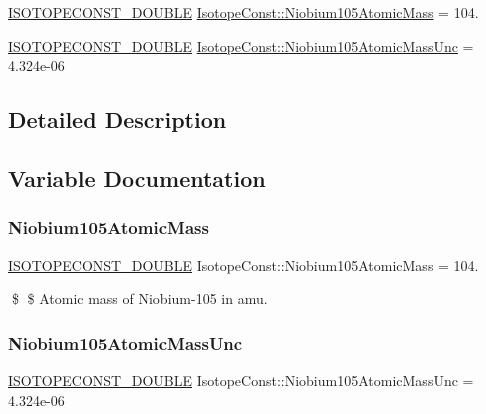 \begin{DoxyCompactItemize}
\item 
\mbox{\hyperlink{group___isotope_const-_macros_ga8f45a7272ce02c0b4c65c44636ed719a}{I\+S\+O\+T\+O\+P\+E\+C\+O\+N\+S\+T\+\_\+\+D\+O\+U\+B\+LE}} \mbox{\hyperlink{group___isotope_const-_niobium-_nb105_gaf553e5c6986396ae3624bb59ffc86ddf}{Isotope\+Const\+::\+Niobium105\+Atomic\+Mass}} = 104.
\item 
\mbox{\hyperlink{group___isotope_const-_macros_ga8f45a7272ce02c0b4c65c44636ed719a}{I\+S\+O\+T\+O\+P\+E\+C\+O\+N\+S\+T\+\_\+\+D\+O\+U\+B\+LE}} \mbox{\hyperlink{group___isotope_const-_niobium-_nb105_ga8095e9133f80bc7ab5b7a01681632142}{Isotope\+Const\+::\+Niobium105\+Atomic\+Mass\+Unc}} = 4.\+324e-\/06
\end{DoxyCompactItemize}


\subsection{Detailed Description}


\subsection{Variable Documentation}
\mbox{\label{group___isotope_const-_niobium-_nb105_gaf553e5c6986396ae3624bb59ffc86ddf}} 
\subsubsection{\texorpdfstring{Niobium105\+Atomic\+Mass}{Niobium105AtomicMass}}
{\footnotesize\ttfamily \mbox{\hyperlink{group___isotope_const-_macros_ga8f45a7272ce02c0b4c65c44636ed719a}{I\+S\+O\+T\+O\+P\+E\+C\+O\+N\+S\+T\+\_\+\+D\+O\+U\+B\+LE}} Isotope\+Const\+::\+Niobium105\+Atomic\+Mass = 104.}

\$ \$ Atomic mass of Niobium-\/105 in amu. \mbox{\label{group___isotope_const-_niobium-_nb105_ga8095e9133f80bc7ab5b7a01681632142}} 
\subsubsection{\texorpdfstring{Niobium105\+Atomic\+Mass\+Unc}{Niobium105AtomicMassUnc}}
{\footnotesize\ttfamily \mbox{\hyperlink{group___isotope_const-_macros_ga8f45a7272ce02c0b4c65c44636ed719a}{I\+S\+O\+T\+O\+P\+E\+C\+O\+N\+S\+T\+\_\+\+D\+O\+U\+B\+LE}} Isotope\+Const\+::\+Niobium105\+Atomic\+Mass\+Unc = 4.\+324e-\/06}

